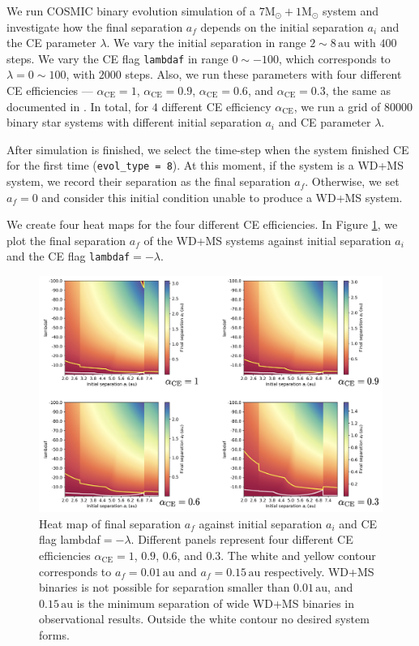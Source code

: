 \documentclass[12pt]{article}
\newcommand{\Msun}{\mathrm{M_{\odot}}}
\newcommand{\alphace}{\alpha_{\mathrm{CE}}}
\newcommand{\au}{\, \mathrm{au}}
\begin{document}
We run COSMIC binary evolution simulation of a $7\Msun + 1\Msun$ system and investigate how the final separation $a_f$ depends on the initial separation $a_i$ and the CE parameter $\lambda$. We vary the initial separation in range $2 \sim 8 \au$ with $400$ steps. We vary the CE flag \verb|lambdaf| in range $0 \sim -100$, which corresponds to $\lambda = 0 \sim 100$, with $2000$ steps. Also, we run these parameters with four different CE efficiencies — $\alphace = 1$, $\alphace = 0.9$, $\alphace = 0.6$, and $\alphace = 0.3$, the same as documented in \cite{yamaguchi_hi}. In total, for $4$ different CE efficiency $\alphace$, we run a grid of $80000$ binary star systems with different initial separation $a_i$ and CE parameter $\lambda$.

After simulation is finished, we select the time-step when the system finished CE for the first time (\verb|evol_type = 8|). At this moment, if the system is a WD+MS system, we record their separation as the final separation $a_f$. Otherwise, we set $a_f = 0$ and consider this initial condition unable to produce a WD+MS system.

We create four heat maps for the four different CE efficiencies. In Figure \ref{res_hi}, we plot the final separation $a_f$ of the WD+MS systems against initial separation $a_i$ and the CE flag \verb|lambdaf|$= - \lambda$.

\begin{figure}
  \centering
  \includegraphics[width=0.8\linewidth]{fig/7+1results.png}
  \caption{ Heat map of final separation $a_f$ against initial separation $a_i$ and CE flag lambdaf$=-\lambda$. Different panels represent four different CE efficiencies $\alphace = 1$, $0.9$, $0.6$, and $0.3$. The white and yellow contour corresponds to $a_f = 0.01 \au$ and $a_f = 0.15 \au$ respectively. WD+MS binaries is not possible for separation smaller than $0.01 \au$, and $0.15 \au$ is the minimum separation of wide WD+MS binaries in observational results. Outside the white contour no desired system forms.}
  \label{res_hi}
\end{figure}
\end{document}
